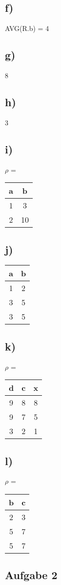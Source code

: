 \documentclass{article}
\begin{document}
	\subsection*{f)}
	AVG(R.b) = 4
	\subsection*{g)}
	8
	\subsection*{h)}
	3
	\subsection*{i)}
	$\rho$ = 
	\begin{tabular}{c|c}
		a & b\\
		\hline
		\hline
		1 & 3 \\
		2 & 10
	\end{tabular}
	\subsection*{j)}
	\begin{tabular}{c|c}
		a & b \\
		\hline
		\hline
		 1&2 \\
		 3&5 \\
		 3&5
	\end{tabular}
	\subsection*{k)}
	$\rho$ = 
		\begin{tabular}{c|c|c}
		d & c & x \\
		\hline
		\hline
		9 & 8 & 8 \\
		9 & 7 & 5 \\
		3 & 2 & 1
	\end{tabular}
	\subsection*{l)}
	$\rho$ = 
	\begin{tabular}{c|c}
		b & c \\
		\hline
		\hline
		2 & 3 \\
		5 & 7 \\
		5 & 7
	\end{tabular}
	\subsection*{Aufgabe 2}
\end{document}
